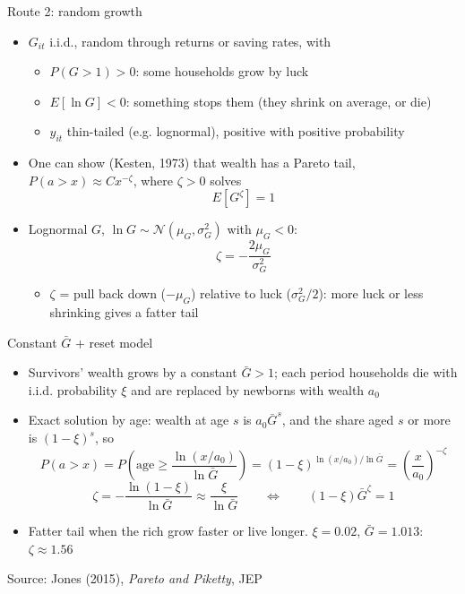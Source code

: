 \documentclass[10pt,english,10pt]{beamer}
\begin{document}
\begin{frame}[label=route2]{Route 2: random growth}
\begin{itemize}
\item $G_{it}$ i.i.d., random through returns or saving rates, with
\begin{itemize}
\item $P(G>1)>0$: some households grow by luck
\item $E[\ln G]<0$: something stops them (they shrink on average, or die)
\item $y_{it}$ thin-tailed (e.g. lognormal), positive with positive probability
\end{itemize}
\item One can show (Kesten, 1973) that wealth has a Pareto tail, $P(a>x)\approx Cx^{-\zeta}$, where $\zeta>0$ solves
\[
E\left[G^{\zeta}\right]=1
\]
\item Lognormal $G$, $\ln G\sim\mathcal{N}(\mu_{G},\sigma_{G}^{2})$ with $\mu_{G}<0$:
\[
\zeta=-\frac{2\mu_{G}}{\sigma_{G}^{2}}
\]
\begin{itemize}
\item $\zeta$ = pull back down ($-\mu_{G}$) relative to luck ($\sigma_{G}^{2}/2$): more luck or less shrinking gives a fatter tail
\end{itemize}
\end{itemize}
\hfill\hyperlink{route2-proof}{}
\end{frame}

\begin{frame}{Constant $\bar{G}$ + reset model}
\begin{itemize}
\item Survivors' wealth grows by a constant $\bar{G}>1$; each period households die with i.i.d. probability $\xi$ and are replaced by newborns with wealth $a_{0}$
\item Exact solution by age: wealth at age $s$ is $a_{0}\bar{G}^{s}$, and the share aged $s$ or more is $(1-\xi)^{s}$, so
\[
P(a>x)=P\left(\text{age}\geq\frac{\ln(x/a_{0})}{\ln\bar{G}}\right)=(1-\xi)^{\ln(x/a_{0})/\ln\bar{G}}=\left(\frac{x}{a_{0}}\right)^{-\zeta}
\]
\[
\zeta=-\frac{\ln(1-\xi)}{\ln\bar{G}}\approx\frac{\xi}{\ln\bar{G}}\qquad\Leftrightarrow\qquad(1-\xi)\bar{G}^{\zeta}=1
\]
\item Fatter tail when the rich grow faster or live longer. $\xi=0.02$, $\bar{G}=1.013$: $\zeta\approx1.56$
\end{itemize}
{\footnotesize Source: Jones (2015), \emph{Pareto and Piketty}, JEP}
\end{frame}
\end{document}
